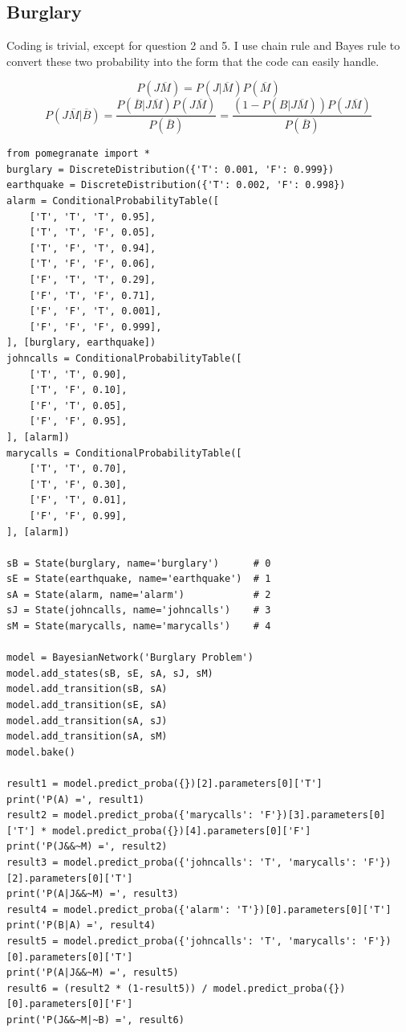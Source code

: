 \documentclass[a4paper, 11pt]{article}
\begin{document}
\subsection{Burglary}
Coding is trivial, except for question 2 and 5. I use chain rule and Bayes rule to convert these two probability into the form that the code can easily handle.

$$
P(J\overline{M})=P(J|\overline{M})P(\overline{M})
$$
$$
P(J\overline{M}|\overline{B})=\dfrac{P(\overline{B}|J\overline{M})P(J\overline{M})}{P(\overline{B})}=\dfrac{(1-P(B|J\overline{M}))P(J\overline{M})}{P(\overline{B})}
$$

\begin{lstlisting}[title=burglary.py]
from pomegranate import *
burglary = DiscreteDistribution({'T': 0.001, 'F': 0.999})
earthquake = DiscreteDistribution({'T': 0.002, 'F': 0.998})
alarm = ConditionalProbabilityTable([
    ['T', 'T', 'T', 0.95],
    ['T', 'T', 'F', 0.05],
    ['T', 'F', 'T', 0.94],
    ['T', 'F', 'F', 0.06],
    ['F', 'T', 'T', 0.29],
    ['F', 'T', 'F', 0.71],
    ['F', 'F', 'T', 0.001],
    ['F', 'F', 'F', 0.999],
], [burglary, earthquake])
johncalls = ConditionalProbabilityTable([
    ['T', 'T', 0.90],
    ['T', 'F', 0.10],
    ['F', 'T', 0.05],
    ['F', 'F', 0.95],
], [alarm])
marycalls = ConditionalProbabilityTable([
    ['T', 'T', 0.70],
    ['T', 'F', 0.30],
    ['F', 'T', 0.01],
    ['F', 'F', 0.99],
], [alarm])

sB = State(burglary, name='burglary')      # 0
sE = State(earthquake, name='earthquake')  # 1
sA = State(alarm, name='alarm')            # 2
sJ = State(johncalls, name='johncalls')    # 3
sM = State(marycalls, name='marycalls')    # 4

model = BayesianNetwork('Burglary Problem')
model.add_states(sB, sE, sA, sJ, sM)
model.add_transition(sB, sA)
model.add_transition(sE, sA)
model.add_transition(sA, sJ)
model.add_transition(sA, sM)
model.bake()

result1 = model.predict_proba({})[2].parameters[0]['T']
print('P(A) =', result1)
result2 = model.predict_proba({'marycalls': 'F'})[3].parameters[0]['T'] * model.predict_proba({})[4].parameters[0]['F']
print('P(J&&~M) =', result2)
result3 = model.predict_proba({'johncalls': 'T', 'marycalls': 'F'})[2].parameters[0]['T']
print('P(A|J&&~M) =', result3)
result4 = model.predict_proba({'alarm': 'T'})[0].parameters[0]['T']
print('P(B|A) =', result4)
result5 = model.predict_proba({'johncalls': 'T', 'marycalls': 'F'})[0].parameters[0]['T']
print('P(A|J&&~M) =', result5)
result6 = (result2 * (1-result5)) / model.predict_proba({})[0].parameters[0]['F']
print('P(J&&~M|~B) =', result6)
\end{lstlisting}
\end{document}
